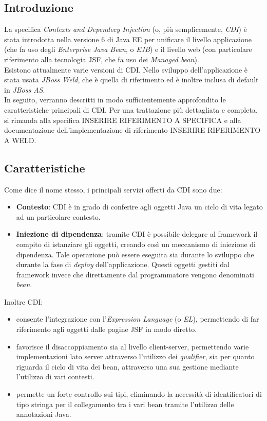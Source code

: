 \subsection{Introduzione}

La specifica \textsl{Contexts and Dependecy Injection} (o, più semplicemente, \textsl{CDI}) è stata introdotta nella versione 6 di Java EE per unificare il livello applicazione (che fa uso degli \textsl{Enterprise Java Bean}, o \textsl{EJB}) e il livello web (con particolare riferimento alla tecnologia JSF, che fa uso dei \textsl{Managed bean}).\\
Esistono attualmente varie versioni di CDI. Nello sviluppo dell'applicazione è stata usata \textsl{JBoss Weld}, che è quella di riferimento ed è inoltre inclusa di default in \textsl{JBoss AS}.\\
In seguito, verranno descritti in modo sufficientemente approfondito le caratteristiche principali di CDI. Per una trattazione più dettagliata e completa, si rimanda alla specifica INSERIRE RIFERIMENTO A SPECIFICA e alla documentazione dell'implementazione di riferimento INSERIRE RIFERIMENTO A WELD.

\subsection{Caratteristiche}

Come dice il nome stesso, i principali servizi offerti da CDI sono due:

\begin{itemize}
\item \textbf{Contesto}: CDI è in grado di conferire agli oggetti Java un ciclo di vita legato ad un particolare contesto.
\item \textbf{Iniezione di dipendenza}: tramite CDI è possibile delegare al framework il compito di istanziare gli oggetti, creando così un meccanismo di iniezione di dipendenza. Tale operazione può essere eseguita sia durante lo sviluppo che durante la fase di \textit{deploy} dell'applicazione. Questi oggetti gestiti dal framework invece che direttamente dal programmatore vengono denominati \textsl{bean}.
\end{itemize}

Inoltre CDI:

\begin{itemize}
\item consente l'integrazione con l'\textsl{Expression Language} (o \textsl{EL}), permettendo di far riferimento agli oggetti dalle pagine JSF in modo diretto.
\item favorisce il disaccoppiamento sia al livello client-server, permettendo varie implementazioni lato server attraverso l'utilizzo dei \textit{qualifier}, sia per quanto riguarda il ciclo di vita dei bean, attraverso una sua gestione mediante l'utilizzo di vari contesti.
\item permette un forte controllo sui tipi, eliminando la necessità di identificatori di tipo stringa per il collegamento tra i vari bean tramite l'utilizzo delle annotazioni Java.
\end{itemize}

